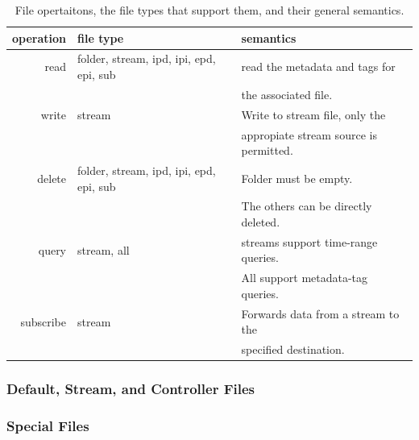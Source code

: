 \begin{table}[h]
\begin{center}
\begin{tabular}{| r | l | l |}
	\hline
	\textbf{operation} & \textbf{file type} & \textbf{semantics} \\ \hline
	read & folder, stream, ipd, ipi, epd, epi, sub & read the metadata and tags for \\
		 &										   & the associated file. \\ \hline
	write &  stream & Write to stream file, only the \\ 
		  & 		& appropiate stream source is permitted.\\ \hline
	delete & folder, stream, ipd, ipi, epd, epi, sub & Folder must be empty.  \\
		   & 										 & The others can be directly deleted. \\ \hline
	query &  stream, all & streams support time-range queries.  \\
		  &			     & All support metadata-tag queries.\\ \hline
	subscribe & stream & Forwards data from a stream to the\\
			  &		   & specified destination.\\
	\hline
\end{tabular}
\caption{File opertaitons, the file types that support them, and their general semantics.}
\label{tab:semantics}
\end{center}
\end{table}

\subsubsection{Default, Stream, and Controller Files}


\subsubsection{Special Files}

